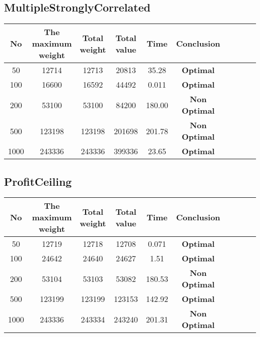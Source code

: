 \documentclass{article}
\begin{document}
\subsection{MultipleStronglyCorrelated}
    \begin{center}
        \begin{tabular}{|c|c| c|c| c|c| c|c| c|c|}
        \hline
            No& The maximum weight & Total weight & Total value& Time&Conclusion \\
        \hline
            50 & 12714 & 12713 & 20813 & 35.28 & \textbf{Optimal}\\
            100 & 16600 & 16592 & 44492 & 0.011 & \textbf{Optimal}\\
            200 & 53100 & 53100 & 84200 & 180.00 & \textbf{Non Optimal}\\
            500 & 123198 & 123198 & 201698 & 201.78 & \textbf{Non Optimal}\\
            1000 & 243336 & 243336 & 399336 & 23.65 & \textbf{Optimal}\\
    \hline
        \hline 
        \end{tabular}
    \end{center}
\subsection{ProfitCeiling}
    \begin{center}
        \begin{tabular}{|c|c| c|c| c|c| c|c| c|c|}
        \hline
            No& The maximum weight & Total weight & Total value& Time&Conclusion \\
        \hline
            50 & 12719 & 12718 & 12708 & 0.071 & \textbf{Optimal}\\
            100 & 24642 & 24640 & 24627 & 1.51 & \textbf{Optimal}\\
            200 & 53104 & 53103 & 53082 & 180.53 & \textbf{Non Optimal}\\
            500 & 123199 & 123199 & 123153 & 142.92 & \textbf{Optimal}\\
            1000 & 243336 & 243334 & 243240 & 201.31 & \textbf{Non Optimal}\\
    \hline
        \hline 
        \end{tabular}
    \end{center}
\end{document}
